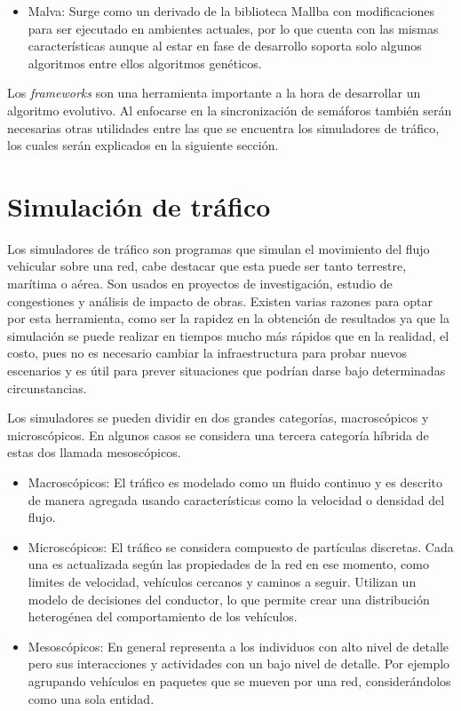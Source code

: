 \begin{itemize}
	\item Malva: Surge como un derivado de la biblioteca Mallba con modificaciones para ser ejecutado en ambientes actuales, por lo que cuenta con las mismas características aunque al estar en fase de desarrollo soporta solo algunos algoritmos entre ellos algoritmos genéticos. \citep{Malva}
\end{itemize}

Los \emph{frameworks} son una herramienta importante a la hora de desarrollar un algoritmo evolutivo. Al enfocarse en la sincronización de semáforos también serán necesarias otras utilidades entre las que se encuentra los simuladores de tráfico, los cuales serán explicados en la siguiente sección.


\section{Simulación de tráfico}

Los simuladores de tráfico son programas que simulan el movimiento del flujo vehicular sobre una red, cabe destacar que esta puede ser tanto terrestre, marítima o aérea. Son usados en proyectos de investigación, estudio de congestiones y análisis de impacto de obras.  Existen varias razones para optar por esta herramienta, como ser la rapidez en la obtención de resultados ya que la simulación se puede realizar en tiempos mucho más rápidos que en la realidad, el costo, pues no es necesario cambiar la infraestructura para probar nuevos escenarios y es útil para prever situaciones que podrían darse bajo determinadas circunstancias.

Los simuladores se pueden dividir en dos grandes categorías, macroscópicos y microscópicos. En algunos casos se considera una tercera categoría híbrida de estas dos llamada mesoscópicos.

\begin{itemize}
	\item Macroscópicos: El tráfico es modelado como un fluido continuo y es descrito de manera agregada usando características como la velocidad o densidad del flujo.
	\item Microscópicos: El tráfico se considera compuesto de partículas discretas. Cada una es actualizada según las propiedades de la red en ese momento, como limites de velocidad, vehículos cercanos y caminos a seguir. Utilizan un modelo de decisiones del conductor, lo que permite crear una distribución heterogénea del comportamiento de los vehículos.
	\item Mesoscópicos: En general representa a los individuos con alto nivel de detalle pero sus interacciones y actividades con un bajo nivel de detalle. Por ejemplo agrupando vehículos en paquetes que se mueven por una red, considerándolos como una sola entidad.
\end{itemize}

